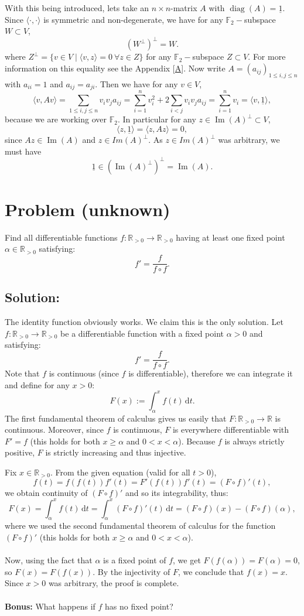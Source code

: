 \documentclass[11pt, a4paper, oneside]{article}
\newcommand{\problem}[1][]{\section{#1} \hfill \par}
\newcommand{\solution}[1][]{\subsection*{#1}\hfill \par}
\theoremstyle{remark}
\theoremstyle{lemma}
\begin{document}
\\\\
With this being introduced, lets take an \( n \times n \)-matrix \( A \) with $\operatorname{diag}(A)=\underline{1}$.
Since \( \langle \cdot, \cdot \rangle \) is symmetric and non-degenerate, we have for any $\mathbb{F}_2-$subspace \( W \subset V \),
\[
\left(W^{\perp}\right)^{\perp} = W.
\] 
where \( Z^\perp = \{ v \in V \mid \langle v, z \rangle = 0 \ \forall z \in Z \} \) for any $\mathbb{F}_{2}-$subspace \( Z \subset V \). For more information on this equality see the Appendix [\hyperref[A]{A}].
Now write \( A = (a_{ij})_{1 \leq i, j \leq n} \) with \( a_{ii} = 1 \) and \( a_{ij} = a_{ji} \). Then we have for any \( v \in V \),
\[
\langle v, Av \rangle = \sum_{1 \leq i, j \leq n} v_i v_j a_{ij} = \sum_{i=1}^n v_i^2 + 2 \sum_{i < j} v_i v_j a_{ij} = \sum_{i=1}^n v_i = \langle v, \underline{1} \rangle,
\]
because we are working over \( \mathbb{F}_2 \). In particular for any \( z \in \operatorname{Im}(A)^\perp\subset V \),
\[
\langle z, \underline{1} \rangle = \langle z, Az \rangle = 0,
\]
since \( Az \in \operatorname{Im}(A) \) and $z\in Im(A)^{\perp}$. As $z\in Im(A)^{\perp}$ was arbitrary, we must have
\[
\underline{1}\in \left(\operatorname{Im}(A)^{\perp}\right)^{\perp} = \operatorname{Im}(A).
\]
\newpage
\problem[Problem (unknown)]
Find all differentiable functions \( f : \mathbb{R}_{>0} \to \mathbb{R}_{>0} \) having at least one fixed point $\alpha\in\mathbb{R}_{>0}$ satisfying:
\[
f' = \frac{f}{f \circ f}.
\]
\solution[Solution:]
The identity function obviously works. We claim this is the only solution. Let $f:\mathbb{R}_{>0}\to\mathbb{R}_{>0}$ be a differentiable function with a fixed point $\alpha>0$ and satisfying:
\[
f' = \frac{f}{f \circ f}.
\]
Note that $f$ is continuous (since $f$ is differentiable), therefore we can integrate it and define for any $x>0$:
\[
F(x) := \int_{\alpha}^{x} f(t) \, \mathrm{d}t.
\]
The first fundamental theorem of calculus gives us easily that $F:\mathbb{R}_{>0}\to\mathbb{R}$ is continuous. Moreover, since $f$ is continuous, $F$ is everywhere differentiable with $F' = f$ (this holds for both $x \geq \alpha$ and $0<x < \alpha$). Because $f$ is always strictly positive, $F$ is strictly increasing and thus injective.

Fix $x \in \mathbb{R}_{>0}$. From the given equation (valid for all $t>0$),
\[
f(t) = f(f(t)) f'(t) = F'(f(t)) f'(t) = (F \circ f)'(t),
\]
we obtain continuity of $(F \circ f)'$ and so its integrability, thus:
\[
F(x) = \int_{\alpha}^{x} f(t) \, \mathrm{d}t = \int_{\alpha}^{x} (F \circ f)'(t) \, \mathrm{d}t = (F \circ f)(x) - (F \circ f)(\alpha),
\]
where we used the second fundamental theorem of calculus for the function $(F \circ f)'$ (this holds for both $x \geq \alpha$ and $0<x < \alpha$).
\\\\
Now, using the fact that $\alpha$ is a fixed point of $f$, we get $F(f(\alpha)) = F(\alpha) = 0$, so $F(x) = F(f(x))$. By the injectivity of $F$, we conclude that $f(x) = x$. Since $x > 0$ was arbitrary, the proof is complete.
\\\\
\textbf{Bonus:} What happens if $f$ has no fixed point?
\end{document}

